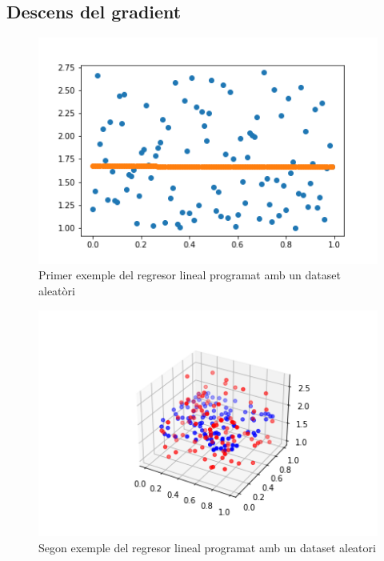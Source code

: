\documentclass[a4paper, 11pt]{article}
\begin{document}
\subsection{Descens del gradient}\label{descens_gradient}
\begin{figure}[h]
    \centering
    \includegraphics[width = 0.7 \textwidth]{R2_GD.png}
    \caption{Primer exemple del regresor lineal programat amb un dataset aleatòri}
\end{figure}
\begin{figure}[h]
    \centering
    \includegraphics[width = 0.8 \textwidth]{R3_GD.png}
    \caption{Segon exemple del regresor lineal programat amb un dataset aleatori}
\end{figure}
\end{document}
